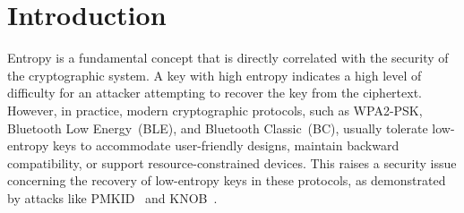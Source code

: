\documentclass[../main.tex]{subfiles}  %
\begin{document}
\section{Introduction}




Entropy is a fundamental concept that is directly correlated with the security of the cryptographic system.
A key with high entropy indicates a high level of difficulty for an attacker attempting to recover the key from the ciphertext.
However, in practice, modern cryptographic protocols, such as WPA2-PSK, Bluetooth Low Energy~(BLE), and Bluetooth Classic~(BC), usually tolerate low-entropy keys to accommodate user-friendly designs, maintain backward compatibility, or support resource-constrained devices.
This raises a security issue concerning the recovery of low-entropy keys in these protocols, as demonstrated by attacks like PMKID~\cite{pmkidattack} and KNOB~\cite{antonioli2019knob}.
\end{document}
